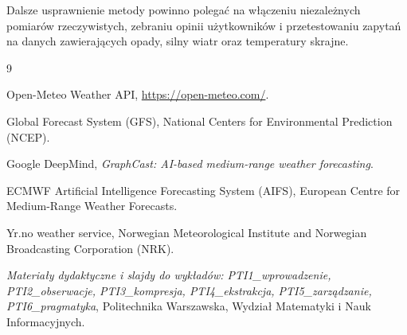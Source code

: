 \documentclass[a4paper,12pt]{article}
\begin{document}
Dalsze usprawnienie metody powinno polegać na włączeniu niezależnych pomiarów
rzeczywistych, zebraniu opinii użytkowników i przetestowaniu zapytań na danych
zawierających opady, silny wiatr oraz temperatury skrajne.

\begin{thebibliography}{9}

Open-Meteo Weather API, \url{https://open-meteo.com/}.

Global Forecast System (GFS), National Centers for Environmental Prediction (NCEP).

Google DeepMind, \textit{GraphCast: AI-based medium-range weather forecasting}.

ECMWF Artificial Intelligence Forecasting System (AIFS), European Centre for Medium-Range Weather Forecasts.

Yr.no weather service, Norwegian Meteorological Institute and Norwegian Broadcasting Corporation (NRK).

\textit{Materiały dydaktyczne i slajdy do wykładów: PTI1\_wprowadzenie, PTI2\_obserwacje, PTI3\_kompresja, PTI4\_ekstrakcja, PTI5\_zarządzanie, PTI6\_pragmatyka}, Politechnika Warszawska, Wydział Matematyki i Nauk Informacyjnych.

\end{thebibliography}
\end{document}
